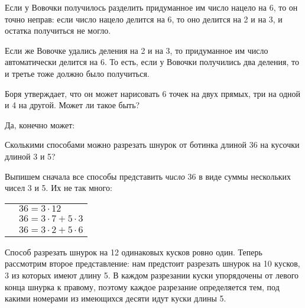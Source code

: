 \begin{itemize}
	\itr Если у Вовочки получилось разделить придуманное им число нацело на 6, то он точно неправ: если число нацело делится на 6, то оно делится на 2 и на 3, и остатка получиться не могло.
	
	Если же Вовочке удались деления на 2 и на 3, то придуманное им число автоматически делится на 6. То есть, если у Вовочки получились два деления, то и третье тоже должно было получиться.

\end{itemize}


\begin{itemize}

	\itA Боря утверждает, что он может нарисовать 6 точек на двух прямых, три на одной и 4 на другой. Может ли такое быть?
	
	\itr Да, конечно может:
	
	\begin{center}  \end{center}
	
	\def\cm#1{\SI{#1}{\text{см}}}
	\itB Сколькими способами можно разрезать шнурок от ботинка длиной \cm{36} на кусочки длиной \cm{3} и \cm{5}?
	
	\itr Выпишем сначала все способы представить {\itshape число} 36 в виде суммы нескольких чисел 3 и 5. Их не так много:
	
	\begin{tabular}{ll}
	\qquad & $36 = 3 \cdot 12$ \\
		& $36 = 3 \cdot 7 + 5 \cdot 3$ \\
		& $36 = 3 \cdot 2 + 5 \cdot 6$
	\end{tabular}
	
	Способ разрезать шнурок на 12 одинаковых кусков ровно один. Теперь рассмотрим второе представление: нам предстоит разрезать шнурок на 10 кусков, 3 из которых имеют длину 5. В каждом разрезании куски упорядочены от левого конца шнурка к правому, поэтому каждое разрезание определяется тем, под какими номерами из имеющихся десяти идут куски длины 5.
	

\end{itemize}
